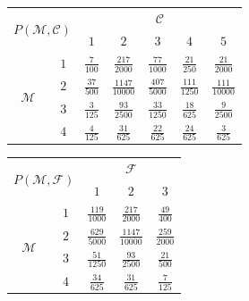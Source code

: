 \documentclass[a4paper, 12pt]{article}
\newcommand{\M}{\mathcal{M}}
\newcommand{\F}{\mathcal{F}}
\newcommand{\C}{\mathcal{C}}
\begin{document}
\begin{table}[H]
	\begin{tabular}{|c|c|c|c|c|c|c|}
		\hline
		\multicolumn{2}{|c|}{\multirow{2}{*}{$P(\M,\C)$}} &                                        \multicolumn{5}{c|}{$\C$}                                        \\ \cline{3-7}
		\multicolumn{2}{|c|}{}                            &       $1$        &         $2$          &        $3$         &        $4$         &         $5$         \\ \hline
		\multirow{4}{*}{$\M$} &            $1$            & $\frac{7}{100}$  &  $\frac{217}{2000}$  & $\frac{77}{1000}$  &  $\frac{21}{250}$  &  $\frac{21}{2000}$  \\ \cline{2-7}
		                      &            $2$            & $\frac{37}{500}$ & $\frac{1147}{10000}$ & $\frac{407}{5000}$ & $\frac{111}{1250}$ & $\frac{111}{10000}$ \\ \cline{2-7}
		                      &            $3$            & $\frac{3}{125}$  &  $\frac{93}{2500}$   & $\frac{33}{1250}$  &  $\frac{18}{625}$  &  $\frac{9}{2500}$   \\ \cline{2-7}
		                      &            $4$            & $\frac{4}{125}$  &   $\frac{31}{625}$   &  $\frac{22}{625}$  &  $\frac{24}{625}$  &   $\frac{3}{625}$   \\ \hline
	\end{tabular}
	\hspace{0.5\mytextsize}
	\begin{tabular}{|c|c|c|c|c|}
		\hline
		\multicolumn{2}{|c|}{\multirow{2}{*}{$P(\M,\F)$}} &                   \multicolumn{3}{c|}{$\F$}                    \\ \cline{3-5}
		\multicolumn{2}{|c|}{}                            &        $1$         &         $2$          &        $3$         \\ \hline
		\multirow{4}{*}{$\M$} &            $1$            & $\frac{119}{1000}$ &  $\frac{217}{2000}$  &  $\frac{49}{400}$  \\ \cline{2-5}
		                      &            $2$            & $\frac{629}{5000}$ & $\frac{1147}{10000}$ & $\frac{259}{2000}$ \\ \cline{2-5}
		                      &            $3$            & $\frac{51}{1250}$  &  $\frac{93}{2500}$   &  $\frac{21}{500}$  \\ \cline{2-5}
		                      &            $4$            &  $\frac{34}{625}$  &   $\frac{31}{625}$   &  $\frac{7}{125}$   \\ \hline

\end{tabular}
\end{table}
\end{document}
